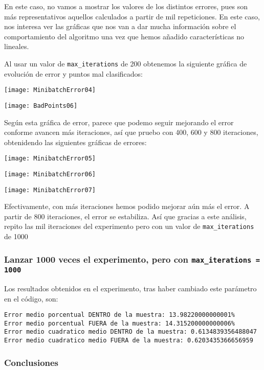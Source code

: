 \documentclass[11pt]{article}
\begin{document}
En este caso, no vamos a mostrar los valores de los distintos errores, pues son más representativos aquellos calculados a partir de mil repeticiones. En este caso, nos interesa ver las gráficas que nos van a dar mucha información sobre el comportamiento del algoritmo una vez que hemos añadido características no lineales.

Al usar un valor de \lstinline{max_iterations} de 200 obtenemos la siguiente gráfica de evolución de error y puntos mal clasificados:

\texttt{[image: MinibatchError04]}

\texttt{[image: BadPoints06]}

Según esta gráfica de error, parece que podemo seguir mejorando el error conforme avancen más iteraciones, así que pruebo con 400, 600 y 800 iteraciones, obtenidendo las siguientes gráficas de errores:


\texttt{[image: MinibatchError05]}

\texttt{[image: MinibatchError06]}

\texttt{[image: MinibatchError07]}

Efectivamente, con más iteraciones hemos podido mejorar aún más el error. A partir de 800 iteraciones, el error se estabiliza. Así que gracias a este análisis, repito las mil iteraciones del experimento pero con un valor de \lstinline{max_iterations} de 1000

\subsubsection{Lanzar 1000 veces el experimento, pero con \lstinline{max_iterations = 1000}}

Los resultados obtenidos en el experimento, tras haber cambiado este parámetro en el código, son:

\begin{lstlisting}
Error medio porcentual DENTRO de la muestra: 13.98220000000001%
Error medio porcentual FUERA de la muestra: 14.315200000000006%
Error medio cuadratico medio DENTRO de la muestra: 0.6134839356488047
Error medio cuadratico medio FUERA de la muestra: 0.6203435366656959
\end{lstlisting}

\subsubsection{Conclusiones}
\end{document}
